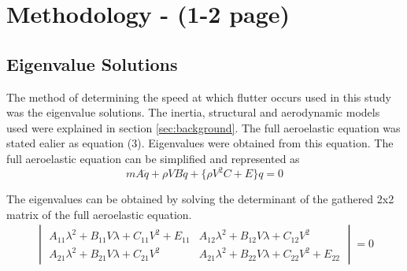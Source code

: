 \documentclass[11pt]{article}
\begin{document}
\section{Methodology - (1-2 page)}
\subsection{Eigenvalue Solutions}
\label{sec:eig}
The method of determining the speed at which flutter occurs used in this study was the eigenvalue solutions. The inertia, structural and aerodynamic models used were explained in section \ref{sec:background}. The full aeroelastic equation was stated ealier as equation (3). Eigenvalues were obtained from this equation. The full aeroelastic equation can be simplified and represented as\\
\begin{equation}\label{eq:simplified-aeroe}
    mA\ddot{q}+\rho VB\dot{q}+\{\rho V^2 C+E\}q = 0
\end{equation}

The eigenvalues can be obtained by solving the determinant of the gathered 2x2 matrix of the full aeroelastic equation.\\

\begin{equation}
    \begin{gathered}
    \begin{vmatrix} A_{11}\lambda^2+B_{11}V\lambda+C_{11}V^2+E_{11} & A_{12}\lambda^2+B_{12}V\lambda+C_{12}V^2\\
    A_{21}\lambda^2+B_{21}V\lambda+C_{21}V^2&A_{21}\lambda^2+B_{22}V\lambda+C_{22}V^2+E_{22}\end{vmatrix}=0
    \end{gathered}
\end{equation}
\end{document}
